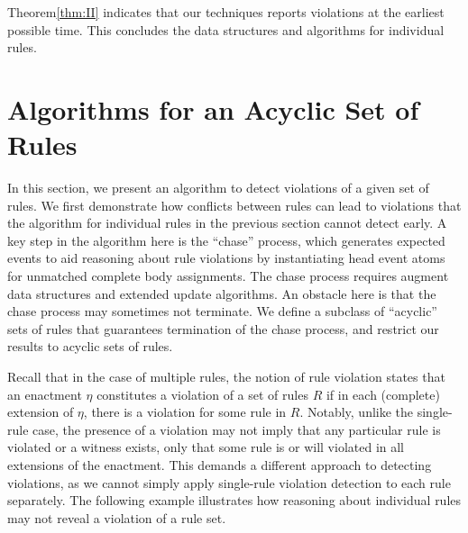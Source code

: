Theorem\:\ref{thm:II} indicates that
our techniques reports violations at the earliest possible time.
This concludes the data structures and algorithms
for individual rules.

\section{Algorithms for an Acyclic Set of Rules}
\label{sec:multiple}

In this section,
we present an algorithm to
detect violations of a given set of rules.
We first demonstrate
how conflicts between rules can lead to violations
that the algorithm for individual rules in
the previous section cannot detect early.
A key step in the algorithm here
is the ``chase'' process,
which generates expected events
to aid reasoning about rule violations
by instantiating head event atoms
for unmatched complete body assignments.
The chase process
requires augment data structures
and extended update algorithms.
An obstacle here is that the chase process
may sometimes not terminate.
We define a subclass of ``acyclic'' sets of rules
that guarantees termination of the chase process,
and restrict our results to acyclic sets of rules.

\smallskip

Recall that in the case of multiple rules,
the notion of rule violation states that
an enactment $\eta$ constitutes a violation of a set of rules $R$
if in each (complete) extension of $\eta$,
there is a violation for some rule in $R$.
Notably,
unlike the single-rule case,
the presence of a violation may not
imply that any particular rule is violated or a witness exists,
only that some rule is or will violated
in all extensions of the enactment.
This demands a different approach to detecting violations,
as we cannot simply apply single-rule violation detection
to each rule separately.
The following example illustrates
how reasoning about individual rules
may not reveal a violation of a rule set.

